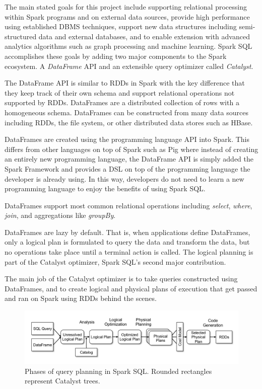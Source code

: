 \documentclass[]{article}
\begin{document}
The main stated goals for this project include supporting relational processing within Spark programs and on external data sources, provide high performance using established DBMS techniques, support new data structures including semi-structured data and external databases, and to enable extension with advanced analytics algorithms such as graph processing and machine learning. Spark SQL accomplishes these goals by adding two major components to the Spark ecosystem. A \textit{DataFrame} API and an extensible query optimizer called \textit{Catalyst}.

The DataFrame API is similar to RDDs in Spark with the key difference that they keep track of their own schema and support relational operations not supported by RDDs. DataFrames are a distributed collection of rows with a homogeneous schema. DataFrames can be constructed from many data sources including RDDs, the file system, or other distributed data stores such as HBase. 

DataFrames are created using the programming language API into Spark. This differs from other languages on top of Spark such as Pig where instead of creating an entirely new programming language, the DataFrame API is simply added the Spark Framework and provides a DSL on top of the programming language the developer is already using. In this way, developers do not need to learn a new programming language to enjoy the benefits of using Spark SQL.

DataFrames support most common relational operations including \textit{select}, \textit{where}, \textit{join}, and aggregations like \textit{groupBy}.

DataFrames are lazy by default. That is, when applications define DataFrames, only a logical plan is formulated to query the data and transform the data, but no operations take place until a terminal action is called. The logical planning is part of the Catalyst optimizer, Spark SQL's second major contribution.

The main job of the Catalyst optimizer is to take queries constructed using DataFrames, and to create logical and physical plans of execution that get passed and ran on Spark using RDDs behind the scenes.

\begin{figure}
    \centering
    \includegraphics[width=0.9\linewidth]{img/sparksql}
    \caption[Phases of query planning in Spark SQL.]{Phases of query planning in Spark SQL. Rounded rectangles represent Catalyst trees. \cite{armbrust2015spark}}
    \label{fig:sparksql}
\end{figure}
\end{document}
